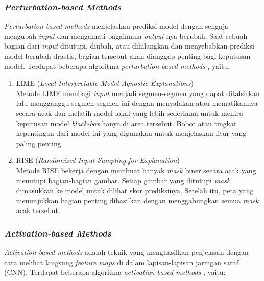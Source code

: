\subsubsection{\textit{Perturbation-based Methods}}
\textit{Perturbation-based methods} menjelaskan prediksi model dengan sengaja mengubah \textit{input} dan mengamati bagaimana \textit{output}-nya berubah. Saat sebuah bagian dari \textit{input} ditutupi, diubah, atau dihilangkan dan menyebabkan prediksi model berubah drastis, bagian tersebut akan dianggap penting bagi keputusan model. Terdapat beberapa algoritma \textit{perturbation-based methods} \autocite{iftikhar2025explainable}, yaitu:

\begin{enumerate}
	\item 	LIME (\textit{Local Interpretable Model-Agnostic Explanations})\\
	Metode LIME membagi \textit{input} menjadi segmen-segmen yang dapat ditafsirkan lalu mengganggu segmen-segmen ini dengan menyalakan atau mematikannya secara acak dan melatih model lokal yang lebih sederhana untuk meniru keputusan model \textit{black-box} hanya di area tersebut. Bobot atau tingkat kepentingan dari model ini yang digunakan untuk menjelaskan fitur yang paling penting.
	
	
	\item RISE (\textit{Randomized Input Sampling for Explanation})\\
	Metode RISE bekerja dengan membuat banyak \textit{mask} biner secara acak yang menutupi bagian-bagian gambar. Setiap gambar yang ditutupi \textit{mask} dimasukkan ke model untuk dilihat skor prediksinya. Setelah itu, peta yang menunjukkan bagian penting dihasilkan dengan menggabungkan semua \textit{mask} acak tersebut.
	
\end{enumerate}

\subsubsection{\textit{Activation-based Methods}}
\textit{Activation-based methods} adalah teknik yang menghasilkan penjelasan dengan cara melihat langsung \textit{feature maps} di dalam lapisan-lapisan jaringan saraf (CNN). Terdapat beberapa algoritma \textit{activation-based methods} \autocite{iftikhar2025explainable}, yaitu:


